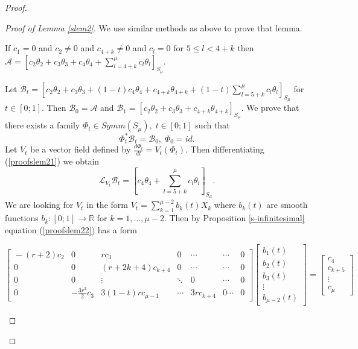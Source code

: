 \documentclass{amsart}
\theoremstyle{definition}
\numberwithin{equation}{section}
\begin{document}
\begin{proof}
\begin{proof}[Proof of Lemma \ref{slem2}]
We use similar methods as above to prove that lemma. \par \noindent If $c_1=0$ and $c_2 \neq 0$ and $c_{4+k} \ne 0$ and $c_l=0$ for $5\leq l< 4+k$ then
$\mathcal{A}= [c_2 \theta_2+c_3 \theta_3+c_4 \theta_4+\sum_{l=4+k}^{\mu}c_{l} \theta_{l}]_{S_{\mu}}$. \par \noindent  Let $\mathcal{B}_t=[c_2 \theta_2+c_3 \theta_3+(1-t)c_4 \theta_4+c_{4+k} \theta_{4+k}+(1-t)\sum_{l=5+k}^{\mu}c_{l} \theta_{l}]_{S_{\mu}}$ \; for $t \in[0;1]$. Then $\mathcal{B}_0=\mathcal{A}$\; and
\;$\mathcal{B}_1=[c_2 \theta_2+c_3 \theta_3+c_{4+k} \theta_{4+k}]_{S_{\mu}}$.
 We prove that there exists a family $\Phi_t \in Symm(S_{\mu}),\;t\in [0;1]$ such that
 \begin{equation}
\label{proofslem21}   \Phi_t^*\mathcal{B}_t=\mathcal{B}_0,\;\Phi_0=id.
\end{equation}
Let $V_t$ be a vector field defined by $\frac{d \Phi_t}{dt}=V_t(\Phi_t)$. Then differentiating (\ref{proofslem21}) we obtain
  \begin{equation}
\label{proofslem22}   \mathcal L_{V_t} \mathcal{B}_t=[c_4 \theta_4+\sum_{l=5+k}^{\mu}c_{l} \theta_{l}]_{S_{\mu}}.
\end{equation}
We are looking for $V_t$ in the form $V_t=\sum_{k=1}^{\mu-2}b_k(t) X_k$   where $b_k(t)$ are smooth functions $b_k:[0;1]\rightarrow \mathbb{R}$ for $k=1,\ldots,\mu-2$.  Then by Proposition  \ref{s-infinitesimal} equation (\ref{proofslem22})
has a form

\setlength{\arraycolsep}{0.3mm}
\begin{small}
\begin{equation}  \label{proofslem23}
\left[ \begin{array}{ccccccc}
\!-(r\!+\!2)c_2 & 0 & rc_3 & 0\  & \cdots & \cdots & 0 \\
0 & 0 & (r\!+\!2k+4)c_{k\!+\!4} & 0 \  & \cdots & \cdots & 0 \\
0 & 0 & \vdots & \ddots & 0 &\cdots & 0 \\
0 & -\frac{3r^2}{2}c_3 & 3(1-t)rc_{\mu-1} & \cdots  & 3rc_{k\!+\!4} & 0 \cdots & 0
\end{array} \right]
\left[ \begin{array}{c} b_1(t) \\ b_2(t) \\ b_3(t) \\ \vdots  \\ b_{\mu-2}(t)  \end{array} \right] =
\left[ \begin{array}{c} c_4 
            \\ c_{k+5} \\ \vdots \\  c_{\mu}  \end{array}  \right]
\end{equation}
\end{small}


\end{proof}
\end{proof}
\end{document}
